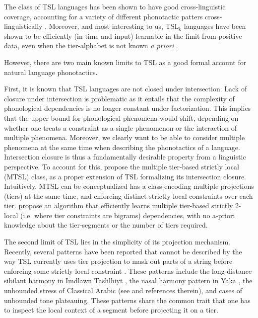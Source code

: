 \documentclass[11pt,a4paper]{article}
\begin{document}
The class of TSL languages has been shown to have good cross-linguistic coverage, accounting for a variety of different phonotactic patters cross-linguistically \citep{HeinzRawalTanner,McMullin16}.
Moreover, and most interesting to us, TSL$_k$ languages have been shown to be efficiently (in time and input) learnable in the limit from positive data, even when the tier-alphabet is not known \emph{a priori}  \citep{JardineHeinz16,Graf17Phonology,jardinemcmullin17}.

However, there are two main known limits to TSL as a good formal account for natural language phonotactics.

First, it is known that TSL languages are not closed under intersection.
Lack of closure under intersection is problematic as it entails that the complexity of phonological dependencies is no longer constant under factorization.
This implies that the upper bound for phonological phenomena would shift, depending on whether one treats a constraint as a single phenomenon or the interaction of multiple phenomena.
Moreover, we clearly want to be able to consider multiple phenomena at the same time when describing the phonotactics of a language.
Intersection closure is thus a fundamentally desirable property from a linguistic perspective.
To account for this, \citet{desanto2019structure} propose the multiple tier-based strictly local (MTSL) class, as a proper extension of TSL formalizing its intersection closure.
Intuitively, MTSL can be conceptualized has a class encoding multiple projections (tiers) at the same time, and enforcing distinct strictly local constraints over each tier.
\citet{McMullinSCIL2019} propose an algorithm that efficiently learns multiple tier-based strictly $2$-local  (i.e. where tier constraints are bigrams) dependencies, with no a-priori knowledge about the tier-segments or the number of tiers required.


The second limit of TSL lies in the simplicity of its projection mechanism.
Recently, several patterns have been reported that cannot be described by the way TSL currently uses tier projection to mask out parts of a string before enforcing some strictly local constraint \citep{McMullin16,MayerMajor18,Baek2017CLS,graf2018sanskrit,desanto2019structure}.
These patterns include the long-distance sibilant harmony in Imdlawn Tashlhiyt  \citep{McMullin16}, the nasal harmony pattern in Yaka \cite{WalkerYaka}, the unbounded stress of Classical Arabic (see \cite{Baek2017CLS} and references therein), and cases of unbounded tone plateauing.
These patterns share the common trait that one has to inspect the local context of a segment before projecting it on a tier. 
\end{document}
